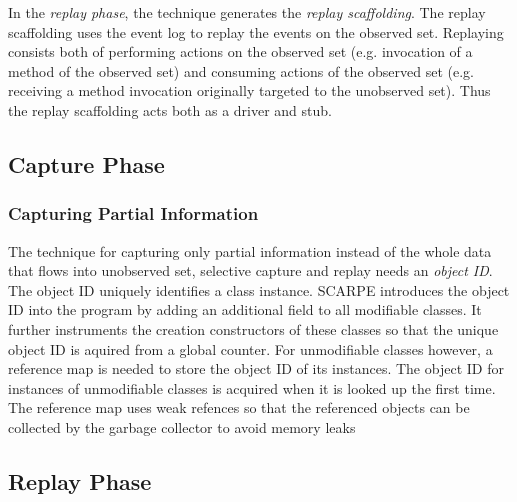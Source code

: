 In the \emph{replay phase}, the technique generates the \emph{replay scaffolding}. The replay scaffolding uses the event log to replay the events on the observed set. Replaying consists both of performing actions on the observed set (e.g. invocation of a method of the observed set) and consuming actions of the observed set (e.g. receiving a method invocation originally targeted to the unobserved set). Thus the replay scaffolding acts both as a driver and stub.

\subsection{Capture Phase}
\subsubsection{Capturing Partial Information}
The technique for capturing only partial information instead of the whole data that flows into unobserved set, selective capture and replay needs an \emph{object ID}. The object ID uniquely identifies a class instance. SCARPE introduces the object ID into the program by adding an additional field to all modifiable classes. It further instruments the creation constructors of these classes so that the unique object ID is aquired from a global counter. For unmodifiable classes however, a reference map is needed to store the object ID of its instances. The object ID for instances of unmodifiable classes is acquired when it is looked up the first time. The reference map uses weak refences so that the referenced objects can be collected by the garbage collector to avoid memory leaks


\subsection{Replay Phase}
